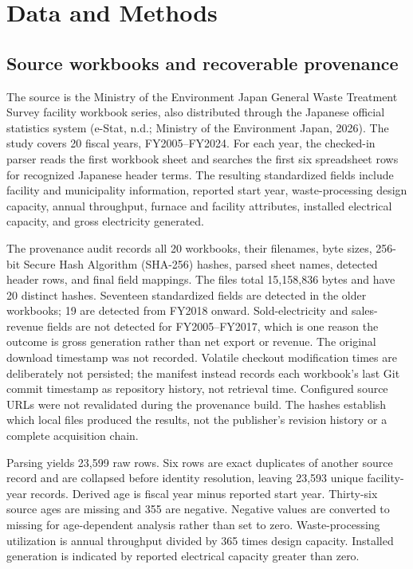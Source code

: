 \documentclass[12pt,a4paper]{article}
\begin{document}
\section{Data and Methods}

\subsection{Source workbooks and recoverable provenance}

The source is the Ministry of the Environment Japan General Waste Treatment
Survey facility workbook series, also distributed through the Japanese official
statistics system (e-Stat, n.d.; Ministry of the Environment Japan, 2026). The
study covers 20 fiscal years, FY2005--FY2024. For each year, the checked-in parser
reads the first workbook sheet and searches the first six spreadsheet rows for
recognized Japanese header terms. The resulting standardized fields include
facility and municipality information, reported start year, waste-processing
design capacity, annual throughput, furnace and facility attributes, installed
electrical capacity, and gross electricity generated.

The provenance audit records all 20 workbooks, their filenames, byte sizes,
256-bit Secure Hash Algorithm (SHA-256) hashes, parsed sheet names, detected
header rows, and final field
mappings. The files total 15,158,836 bytes and have 20 distinct hashes.
Seventeen standardized fields are detected in the older workbooks; 19 are
detected from FY2018 onward. Sold-electricity and sales-revenue fields are not
detected for FY2005--FY2017, which is one reason the outcome is gross generation
rather than net export or revenue. The original download timestamp was not
recorded. Volatile checkout modification times are deliberately not persisted;
the manifest instead records each workbook's last Git commit timestamp as
repository history, not retrieval time. Configured source URLs were not
revalidated during the provenance build. The hashes establish which local
files produced the results, not the publisher's revision history or a complete
acquisition chain.

Parsing yields 23,599 raw rows. Six rows are exact duplicates of another source
record and are collapsed before identity resolution, leaving 23,593 unique
facility-year records. Derived age is fiscal year minus reported start year.
Thirty-six source ages are missing and 355 are negative. Negative values are
converted to missing for age-dependent analysis rather than set to zero.
Waste-processing utilization is annual throughput divided by 365 times design
capacity. Installed generation is indicated by reported electrical capacity
greater than zero.
\end{document}
